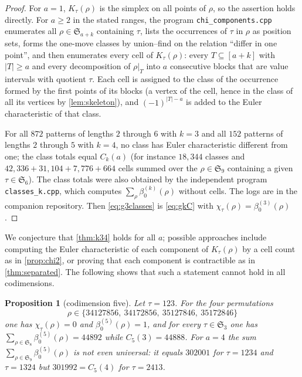 \documentclass[11pt,reqno]{amsart}
\theoremstyle{plain}
\newtheorem{proposition}[proposition]{Proposition}
\theoremstyle{definition}
\theoremstyle{remark}
\newcommand{\Sym}{\mathfrak{S}}
\newcommand{\bz}{\beta_0}
\begin{document}
\begin{proof}
For $a=1$, $K_\tau(\rho)$ is the simplex on all points of $\rho$,
so the assertion holds directly. For $a\ge2$ in the stated ranges,
the program \texttt{chi\_components.cpp} enumerates all $\rho\in\Sym_{a+k}$ containing $\tau$, lists the occurrences of $\tau$ in $\rho$ as position sets, forms the one-move classes by union--find on the relation ``differ in one point'', and then enumerates every cell of $K_\tau(\rho)$: every $T\subseteq[a+k]$ with $|T|\ge a$ and every decomposition of $\rho|_T$ into $a$ consecutive blocks that are value intervals with quotient $\tau$. Each cell is assigned to the class of the occurrence formed by the first points of its blocks (a vertex of the cell, hence in the class of all its vertices by \cref{lem:skeleton}), and $(-1)^{|T|-a}$ is added to the Euler characteristic of that class. 

For all $872$ patterns of lengths $2$ through $6$ with $k=3$ and all $152$ patterns of lengths $2$ through $5$ with $k=4$, no class has Euler characteristic different from one; the class totals equal $C_k(a)$ (for instance $18{,}344$ classes and $42{,}336+31{,}104+7{,}776+664$ cells summed over the $\rho\in\Sym_9$ containing a given $\tau\in\Sym_6$). The class totals were also obtained by the independent program \texttt{classes\_k.cpp}, which computes $\sum_\rho\bz^{(k)}(\rho)$ without cells. The logs are in the companion repository. Then \eqref{eq:g3classes} is \eqref{eq:gkC} with $\chi_\tau(\rho)=\bz^{(3)}(\rho)$.
\end{proof}

We conjecture that \cref{thm:k34} holds for all $a$; possible approaches include computing the Euler characteristic of each component of $K_\tau(\rho)$ by a cell count as in \cref{prop:chi2}, or proving that each component is contractible as in \cref{thm:separated}. The following shows that such a statement cannot hold in all codimensions.

\begin{proposition}[codimension five]\label{prop:k5}
Let $\tau=123$. For the four permutations
\[
\rho\in\{34127856,\ 34172856,\ 35127846,\ 35172846\}
\]
one has $\chi_\tau(\rho)=0$ and $\bz^{(5)}(\rho)=1$, and for every $\tau\in\Sym_3$ one has $\sum_{\rho\in\Sym_8}\bz^{(5)}(\rho)=44892$ while $C_5(3)=44888$. For $a=4$ the sum $\sum_{\rho\in\Sym_9}\bz^{(5)}(\rho)$ is not even universal: it equals $302001$ for $\tau=1234$ and $\tau=1324$ but $301992=C_5(4)$ for $\tau=2413$.
\end{proposition}
\end{document}
